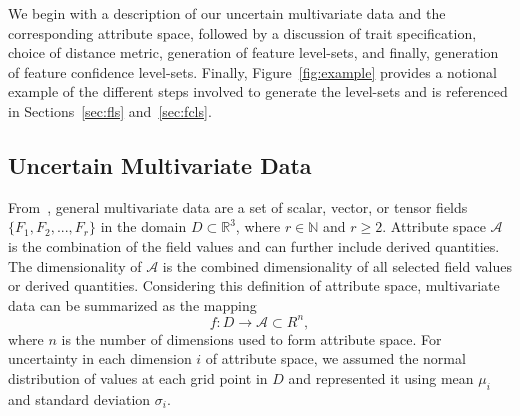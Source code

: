 \setlength{\belowdisplayskip}{4pt} \setlength{\belowdisplayshortskip}{4pt}
\setlength{\abovedisplayskip}{4pt} \setlength{\abovedisplayshortskip}{4pt}

We begin with a description of our uncertain multivariate data and the corresponding attribute space, followed by a discussion of trait specification, choice of distance metric, generation of feature level-sets, and finally, generation of feature confidence level-sets.
%
Finally, Figure~\ref{fig:example} provides a notional example of the different steps involved to generate the level-sets and is referenced in Sections~\ref{sec:fls} and~\ref{sec:fcls}.
%

\vspace{-2mm}
\subsection{Uncertain Multivariate Data}
%
From~\cite{jankowai2020feature}, general multivariate data are a set of scalar, vector, or tensor fields $\{F_1,F_2,...,F_r\}$ in the domain $D \subset \mathbb{R}^{3}$, where $r\in\mathbb{N}$ and $r\geq2$.
%
%
%
Attribute space $\mathcal{A}$ is the combination of the field values and can further include derived quantities.
%
The dimensionality of $\mathcal{A}$ is the combined dimensionality of all selected field values or derived quantities.
%
Considering this definition of attribute space, multivariate data can be summarized as the mapping
\begin{equation}
f : D \to \mathcal{A} \subset R^{n},
\end{equation}
%
where $n$ is the number of dimensions used to form attribute space. 
%
%
For uncertainty in each dimension $i$ of attribute space, we assumed the normal distribution of values at each grid point in $D$ and represented it using mean ${\mu}_{i}$ and standard deviation ${\sigma}_{i}$. 

\vspace{-2mm}
